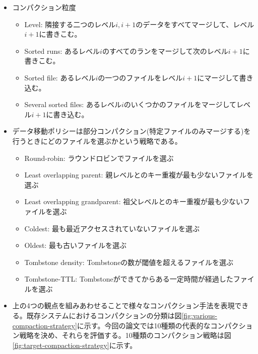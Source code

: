 \documentclass[dvipdfmx,uplatex]{jsarticle}
\theoremstyle{remark}
\newenvironment{method}[1]{
    \begin{tcolorbox}[
        colframe=green!50!black,
        colback=green!50!black!10!white,
        colbacktitle=green!50!black!40!white,
        coltitle=black,
        fonttitle=\bfseries,
        title={#1}
    ]
}{
    \end{tcolorbox}
}
\begin{document}
\begin{method}{コンパクションの設計空間}
\begin{itemize}
\begin{itemize}
    \end{itemize}
    \item コンパクション粒度
    \begin{itemize}
        \item Level: 隣接する二つのレベル$i, i+1$のデータをすべてマージして、レベル$i+1$に書きこむ。
        \item Sorted runs: あるレベル$i$のすべてのランをマージして次のレベル$i+1$に書きこむ。
        \item Sorted file: あるレベル$i$の一つのファイルをレベル$i+1$にマージして書き込む。
        \item Several sorted files: あるレベル$i$のいくつかのファイルをマージしてレベル$i+1$に書き込む。
    \end{itemize}
    \item データ移動ポリシーは部分コンパクション(特定ファイルのみマージする)を行うときにどのファイルを選ぶかという戦略である。
    \begin{itemize}
        \item Round-robin: ラウンドロビンでファイルを選ぶ
        \item Least overlapping parent: 親レベルとのキー重複が最も少ないファイルを選ぶ
        \item Least overlapping grandparent: 祖父レベルとのキー重複が最も少ないファイルを選ぶ
        \item Coldest: 最も最近アクセスされていないファイルを選ぶ
        \item Oldest: 最も古いファイルを選ぶ
        \item Tombstone density: Tombstoneの数が閾値を超えるファイルを選ぶ
        \item Tombstone-TTL: Tombstoneができてからある一定時間が経過したファイルを選ぶ
    \end{itemize}
    \item 上の4つの観点を組みあわせることで様々なコンパクション手法を表現できる。既存システムにおけるコンパクションの分類は図\ref{fig:various-compaction-strategy}に示す。今回の論文では10種類の代表的なコンパクション戦略を決め、それらを評価する。10種類のコンパクション戦略は図\ref{fig:target-compaction-strategy}に示す。
\end{itemize}
\end{method}
\end{document}
